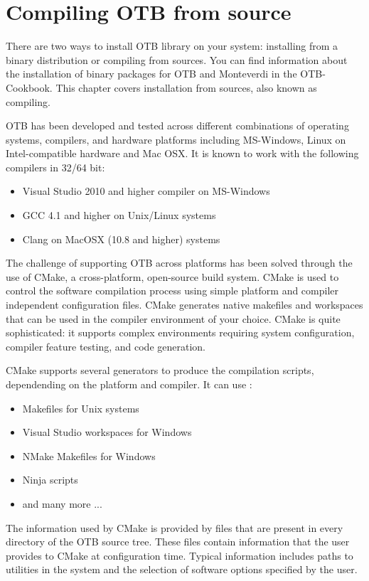 \setcounter{secnumdepth}{3}

\chapter{Compiling OTB from source}
\label{chapter:Installation}

There are two ways to install OTB library on your system: installing from a binary distribution or compiling from sources. 
You can find information about the installation of binary packages for OTB and Monteverdi in the OTB-Cookbook.
This chapter covers installation from sources, also known as compiling.

OTB has been developed and tested across different combinations of operating systems, compilers, and hardware platforms including MS-Windows, Linux on Intel-compatible hardware and Mac OSX.  It is known to work with the following compilers in 32/64 bit:
\begin{itemize}
\item Visual Studio 2010 and higher compiler on MS-Windows
\item GCC 4.1 and higher on Unix/Linux systems
\item Clang on MacOSX (10.8 and higher) systems
\end{itemize}

The challenge of supporting OTB across platforms has been solved through the use of CMake, a cross-platform, open-source
build system. CMake is used to control the software compilation process using simple platform and compiler independent
configuration files.  CMake generates native makefiles and workspaces that can be used in the compiler environment of
your choice. CMake is quite sophisticated: it supports complex environments requiring system configuration, compiler
feature testing, and code generation.

CMake supports several generators to produce the compilation scripts, dependending on the platform and compiler. It can use :
\begin{itemize}
\item Makefiles for Unix systems
\item Visual Studio workspaces for Windows
\item NMake Makefiles for Windows
\item Ninja scripts
\item and many more ...
\end{itemize}
The information used by CMake is provided by  files that
are present in every directory of the OTB source tree. These files contain information that the user provides to CMake
at configuration time. Typical information includes paths to utilities in the system and the selection of software
options specified by the user.

